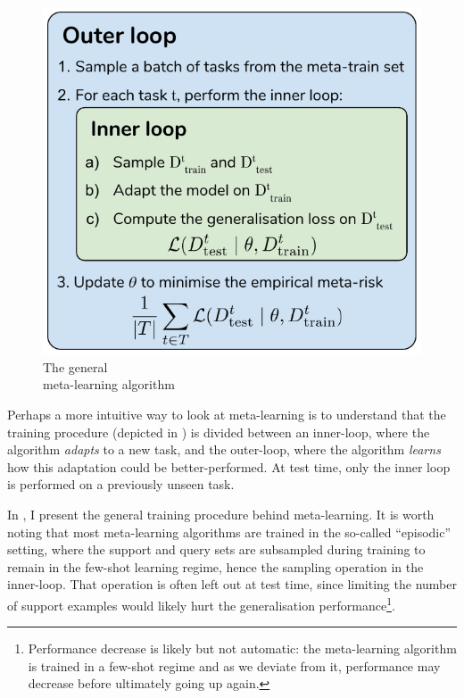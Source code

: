 \documentclass[11pt]{article}
\numberwithin{equation}{subsection}
\begin{document}
\begin{figure}
  \centering
  \includegraphics[width=.95\linewidth]{scoring/metaml}
  \caption{The general\\meta-learning algorithm} %
  \label{fig:metaml}
\end{figure}


Perhaps a more intuitive way to look at meta-learning is to understand that the training procedure (depicted in ) is divided between an inner-loop, where the algorithm \textit{adapts} to a new task, and the outer-loop, where the algorithm \textit{learns} how this adaptation could be better-performed. At test time, only the inner loop is performed on a previously unseen task.

In , I present the general training procedure behind meta-learning. It is worth noting that most meta-learning algorithms are trained in the so-called ``episodic'' setting, where the support and query sets are subsampled during training to remain in the few-shot learning regime, hence the sampling operation in the inner-loop. That operation is often left out at test time, since limiting the number of support examples would likely hurt the generalisation performance\footnote{Performance decrease is likely but not automatic: the meta-learning algorithm is trained in a few-shot regime and as we deviate from it, performance may decrease before ultimately going up again.}.
\end{document}
